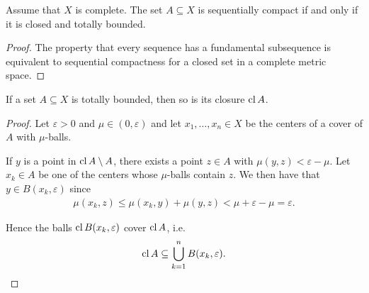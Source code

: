 \begin{corollary}\label{thm:metric_space_compact_iff_closed_totally_bounded}
  Assume that $X$ is complete. The set $A \subseteq X$ is sequentially compact if and only if it is closed and totally bounded.
\end{corollary}
\begin{proof}
  The property that every sequence has a fundamental subsequence is equivalent to sequential compactness for a closed set in a complete metric space.
\end{proof}

\begin{proposition}\label{thm:closure_of_totally_bounded_is_totally_bounded}
  If a set $A \subseteq X$ is totally bounded, then so is its closure $\operatorname{cl} A$.
\end{proposition}
\begin{proof}
  Let $\varepsilon > 0$ and $\mu \in (0, \varepsilon)$ and let $x_1, \ldots, x_n \in X$ be the centers of a cover of $A$ with $\mu$-balls.

  If $y$ is a point in $\operatorname{cl} A \setminus A$, there exists a point $z \in A$ with $\mu(y, z) < \varepsilon - \mu$. Let $x_k \in A$ be one of the centers whose $\mu$-balls contain $z$. We then have that $y \in B(x_k, \varepsilon)$ since
  \begin{align*}
    \mu(x_k, z) \leq \mu(x_k, y) + \mu(y, z) < \mu + \varepsilon - \mu = \varepsilon.
  \end{align*}

  Hence the balls $\operatorname{cl} B(x_k, \varepsilon)$ cover $\operatorname{cl} A$, i.e.
  \begin{align*}
    \operatorname{cl} A \subseteq \bigcup_{k=1}^n B(x_k, \varepsilon).
  \end{align*}
\end{proof}

